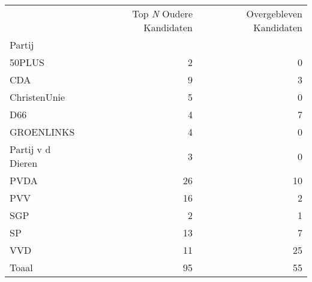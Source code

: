\begin{tabular}{lrr}
\toprule
{} &  Top \textit{N} Oudere Kandidaten &  Overgebleven Kandidaten \\
Partij                &                          &                          \\
\midrule
50PLUS                &                        2 &                        0 \\
CDA                   &                        9 &                        3 \\
ChristenUnie          &                        5 &                        0 \\
D66                   &                        4 &                        7 \\
GROENLINKS            &                        4 &                        0 \\
Partij v d Dieren &                        3 &                        0 \\
PVDA                  &                       26 &                       10 \\
PVV                   &                       16 &                        2 \\
SGP                   &                        2 &                        1 \\
SP                    &                       13 &                        7 \\
VVD                   &                       11 &                       25 \\
\midrule
Toaal				  & 						95&                        55\\
\bottomrule
\end{tabular}
